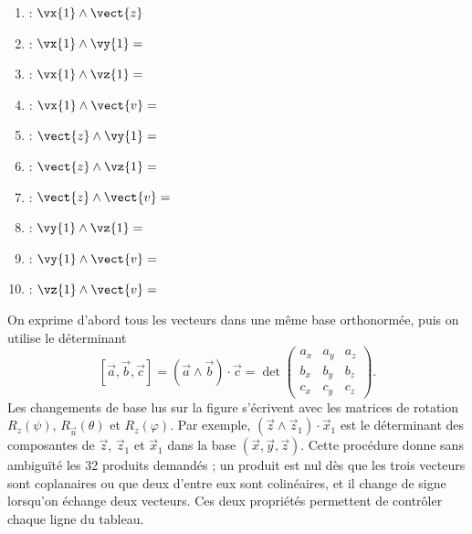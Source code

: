 \begin{corrigebox}
\begin{enumerate}
\item : $\vx{1}\wedge\vect{z}$
\item : $\vx{1}\wedge\vy{1} = $
\item : $\vx{1}\wedge\vz{1} = $
\item : $\vx{1}\wedge\vect{v} = $
\item : $\vect{z}\wedge\vy{1} = $
\item : $\vect{z}\wedge\vz{1} = $
\item : $\vect{z}\wedge\vect{v} = $
\item : $\vy{1}\wedge\vz{1} = $
\item : $\vy{1}\wedge\vect{v} = $
\item : $\vz{1}\wedge\vect{v} = $
\end{enumerate}
On exprime d'abord tous les vecteurs dans une même base orthonormée,
            puis on utilise le déterminant
            $$[\vec a,\vec b,\vec c]=(\vec a\wedge\vec b)\cdot\vec c
            =\det\!\begin{pmatrix}a_x&a_y&a_z\\b_x&b_y&b_z\\c_x&c_y&c_z\end{pmatrix}.$$
            Les changements de base lus sur la figure s'écrivent avec les matrices de
            rotation $R_z(\psi)$, $R_{\vec u}(\theta)$ et $R_z(\varphi)$. Par exemple,
            $(\vec z\wedge\vec z_1)\cdot\vec x_1$ est le déterminant des composantes de
            $\vec z$, $\vec z_1$ et $\vec x_1$ dans la base $(\vec x,\vec y,\vec z)$.
            Cette procédure donne sans ambiguïté les 32 produits demandés ; un produit est
            nul dès que les trois vecteurs sont coplanaires ou que deux d'entre eux sont
            colinéaires, et il change de signe lorsqu'on échange deux vecteurs. Ces deux
            propriétés permettent de contrôler chaque ligne du tableau.
\end{corrigebox}
